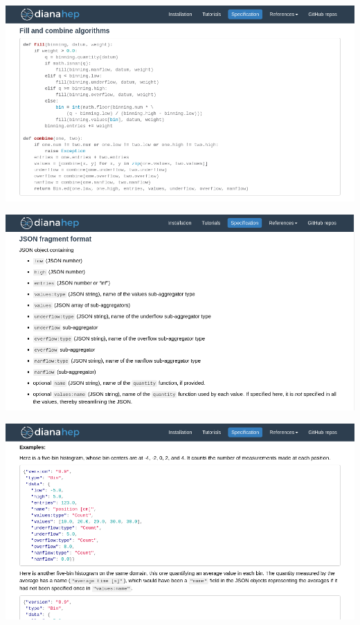 \documentclass[aspectratio=169]{beamer}
\begin{document}
\begin{frame}{}
\hspace{-1 cm}\mbox{\includegraphics[width=16 cm]{spec3.png}\hspace{-5 cm}}
\end{frame}

\begin{frame}{}
\hspace{-1 cm}\mbox{\includegraphics[width=16 cm]{spec4.png}\hspace{-5 cm}}
\end{frame}

\begin{frame}{}
\hspace{-1 cm}\mbox{\includegraphics[width=16 cm]{spec5.png}\hspace{-5 cm}}
\end{frame}
\end{document}
